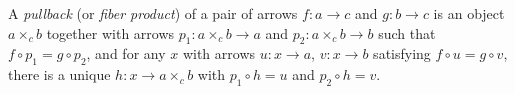 A \emph{pullback} (or \emph{fiber product}) of a pair of arrows $f: a \to c$ and $g: b \to c$ is an object $a \times_c b$ together with arrows $p_1: a \times_c b \to a$ and $p_2: a \times_c b \to b$ such that $f \circ p_1 = g \circ p_2$, and for any $x$ with arrows $u: x \to a$, $v: x \to b$ satisfying $f \circ u = g \circ v$, there is a unique $h: x \to a \times_c b$ with $p_1 \circ h = u$ and $p_2 \circ h = v$.

